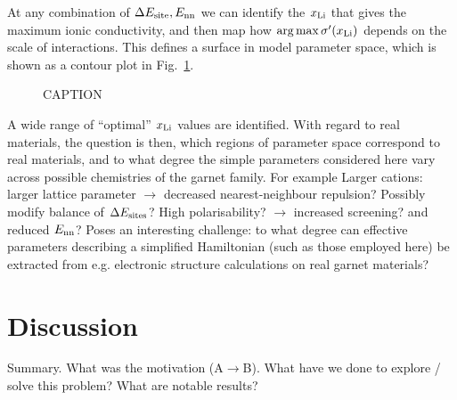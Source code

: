 \documentclass[aps,prb,twocolumn,superscriptaddress,reprint]{revtex4-1}
\newcommand{\xLi}{x_\m{Li}}
\begin{document}
At any combination of $\Delta E_{\mathrm{site}}, E_{\mathrm{nn}}$ we can identify the $\xLi$ that gives the maximum ionic conductivity, and then map how $\arg\max \sigma^\prime(\xLi)$ depends on the scale of interactions. 
This defines a surface in model parameter space, which is shown as a contour plot in Fig.\ \ref{fig:max_sigma}.
\begin{figure}[tb]
  \centering
    \caption{\label{fig:max_sigma}CAPTION}
\end{figure}
A wide range of ``optimal'' $\xLi$ values are identified. 
With regard to real materials, the question is then, which regions of parameter space correspond to real materials, and to what degree the simple parameters considered here vary across possible chemistries  of the garnet family. 
For example  Larger cations: larger lattice parameter $\to$ decreased nearest-neighbour repulsion? Possibly modify balance of $\Delta E_{\mathrm{sites}}$? High polarisability? $\to$ increased screening? and reduced $E_{\mathrm{nn}}$? Poses an interesting challenge: to what degree can effective parameters describing a simplified Hamiltonian (such as those employed here) be extracted from e.g. electronic structure calculations on real garnet materials?

\section{Discussion}

Summary. 
What was the motivation (A$\to$B). 
What have we done to explore / solve this problem? What are notable results?
\end{document}
